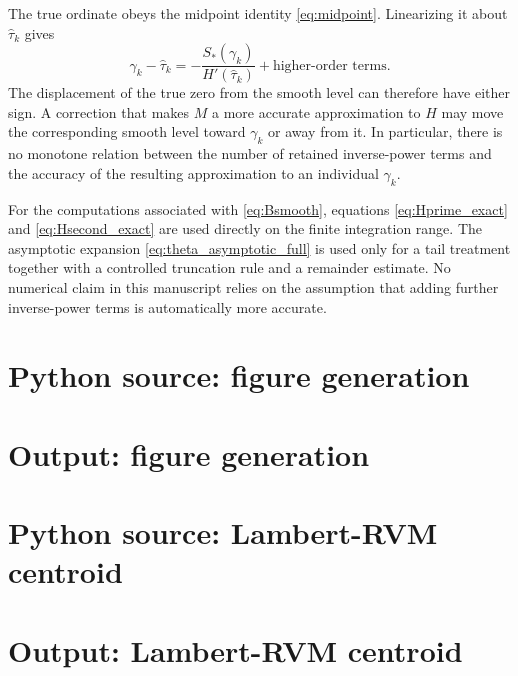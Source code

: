 \documentclass[11pt]{amsart}
\numberwithin{equation}{section}
\theoremstyle{definition}
\theoremstyle{remark}
\begin{document}
The true ordinate obeys the midpoint identity \eqref{eq:midpoint}. Linearizing it about $\widehat\tau_k$ gives
\begin{equation}\label{eq:true_zero_exact_smooth_shift}
\gamma_k-\widehat\tau_k
=-\frac{S_*(\gamma_k)}{H'(\widehat\tau_k)}
+\text{higher-order terms}.
\end{equation}
The displacement of the true zero from the smooth level can therefore have either sign. A correction that makes $M$ a more accurate approximation to $H$ may move the corresponding smooth level toward $\gamma_k$ or away from it. In particular, there is no monotone relation between the number of retained inverse-power terms and the accuracy of the resulting approximation to an individual $\gamma_k$.

For the computations associated with \eqref{eq:Bsmooth}, equations \eqref{eq:Hprime_exact} and \eqref{eq:Hsecond_exact} are used directly on the finite integration range. The asymptotic expansion \eqref{eq:theta_asymptotic_full} is used only for a tail treatment together with a controlled truncation rule and a remainder estimate. No numerical claim in this manuscript relies on the assumption that adding further inverse-power terms is automatically more accurate.


\section{Python source: figure generation}\label{sec:python_figures}


\section{Output: figure generation}\label{sec:output_figures}


\section{Python source: Lambert-RVM centroid}\label{sec:python_rvm}


\section{Output: Lambert-RVM centroid}\label{sec:output_rvm}

\end{document}
